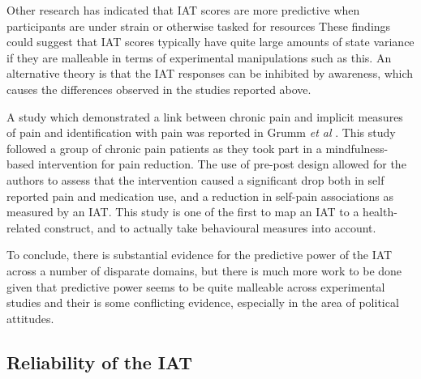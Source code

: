 Other research has indicated that IAT scores are more predictive when participants are under strain or otherwise tasked for resources \cite{Hofmann2008a} These findings could suggest that IAT scores typically have quite large amounts of state variance if they are malleable in terms of experimental manipulations such as this. An alternative theory is that the IAT responses can be inhibited by awareness, which causes the differences observed in the studies reported above.  %


A study which demonstrated a link between chronic pain and implicit measures of pain and identification with pain was reported in Grumm \textit{et al} \cite{Grumm2008}. This study followed a group of chronic pain patients as they took part in a mindfulness-based intervention for pain reduction. The use of pre-post design allowed for the authors to assess that the intervention caused a significant drop both in self reported pain and medication use, and a reduction in self-pain associations as measured by an IAT. This study is one of the first to map an IAT to a health-related construct, and to actually take behavioural measures into account. 

To conclude, there is substantial evidence for the predictive power of the IAT across a number of disparate domains, but there is much more work to be done given that predictive power seems to be quite malleable across experimental studies and their is some conflicting evidence, especially in the area of political attitudes. 

\subsection{Reliability of the IAT}
\label{sec:reliability-iat}

